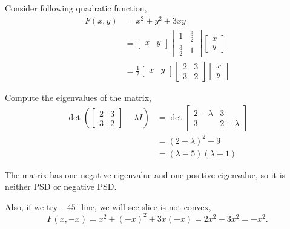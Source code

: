 \begin{example} Consider following quadratic function,
	\begin{align*}
	F(x,y) 
	&= x^2 + y^2 + 3xy \\
	&= 
	\begin{bmatrix}
	x&y
	\end{bmatrix}
	\begin{bmatrix}
	1&\frac{3}{2}\\
	\frac{3}{2} & 1
	\end{bmatrix}
	\begin{bmatrix}
	x\\
	y
	\end{bmatrix}\\
	&=\frac{1}{2}
	\begin{bmatrix}
	x&y
	\end{bmatrix}
	\begin{bmatrix}
	2&3\\
	3 & 2
	\end{bmatrix}
	\begin{bmatrix}
	x\\
	y
	\end{bmatrix}
	\end{align*}
	
	Compute the eigenvalues of the matrix, 
	\begin{align*}
	\det(
	\begin{bmatrix}
	2&3\\
	3&2
	\end{bmatrix} 
	- \lambda I) 
	&= \det
	\begin{bmatrix}
	2-\lambda & 3\\
	3 & 2-\lambda
	\end{bmatrix}\\
	&= (2-\lambda)^2 - 9\\
	&= (\lambda - 5)(\lambda + 1)
	\end{align*}
	
	The matrix has one negative eigenvalue and one positive eigenvalue, so it is neither PSD or negative PSD.
	
	Also, if we try $-45^{\circ}$ line, we will see slice is not convex,
	$$F(x,-x) = x^2 + (-x)^2 + 3x(-x) = 2x^2 - 3x^2 = -x^2.$$
	
\end{example}

